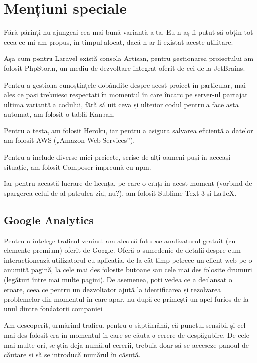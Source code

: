 \section{Mențiuni speciale}

	Fără părinți nu ajungeai cea mai bună variantă a ta.
	Eu n-aș fi putut să obțin tot ceea ce mi-am propus, în timpul alocat, dacă n-ar fi existat aceste utilitare.

	Așa cum pentru Laravel există consola Artisan, pentru gestionarea proiectului am folosit PhpStorm, un mediu de dezvoltare integrat oferit de cei de la JetBrains.

	Pentru a gestiona cunoștințele dobândite despre acest proiect în particular, mai ales ce pași trebuiesc respectați în momentul în care încarc pe server-ul partajat ultima variantă a codului, fără să uit ceva și ulterior codul pentru a face asta automat, am folosit o tablă Kanban.

	Pentru a testa, am folosit Heroku, iar pentru a asigura salvarea eficientă a datelor am folosit AWS („Amazon Web Services”).

	Pentru a include diverse mici proiecte, scrise de alți oameni puși în aceeași situație, am folosit Composer împreună cu npm.

	Iar pentru această lucrare de licență, pe care o citiți în acest moment (vorbind de spargerea celui de-al patrulea zid, nu?), am folosit Sublime Text 3 și \LaTeX.

	\subsection{Google Analytics}

	Pentru a înțelege traficul venind, am ales să folosesc analizatorul gratuit (cu elemente premium) oferit de Google.
	Oferă o sumedenie de detalii despre cum interacționează utilizatorul cu aplicația, de la cât timp petrece un client web pe o anumită pagină, la cele mai des folosite butoane sau cele mai des folosite drumuri (legături între mai multe pagini). \cite{google_analytics}
	De asemenea, poți vedea ce a declanșat o eroare, ceea ce pentru un dezvoltator ajută la identificarea și rezolvarea problemelor din momentul în care apar, nu după ce primești un apel furios de la unul dintre fondatorii companiei.

	Am descoperit, urmărind traficul pentru o săptămână, că punctul sensibil și cel mai des folosit era în momentul în care se căuta o cerere de despăgubire.
	De cele mai multe ori, se știa deja numărul cererii, trebuia doar să se acceseze panoul de căutare și să se introducă numărul în căsuță.

